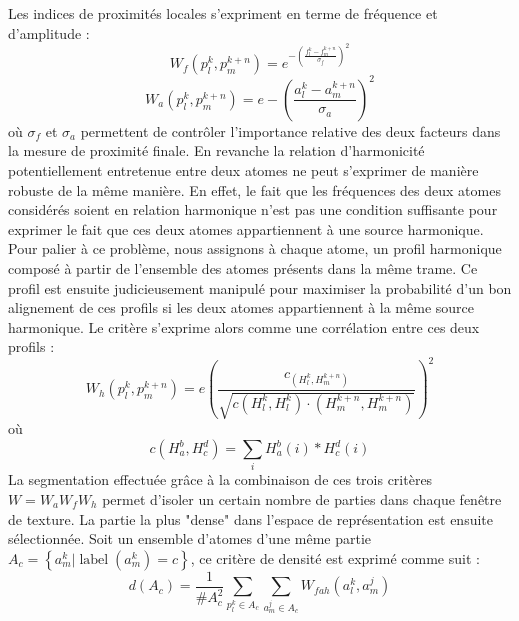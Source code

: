   Les indices de proximités locales s'expriment en terme de fréquence et d'amplitude :
  \begin{equation}
  W_f \left( p _ { l } ^ { k } , p _ { m } ^ { k + n } \right) = e ^ { - \left( \frac { f _ { l } ^ { k } - f _ { m } ^ { k + n } } { \sigma _ { f } } \right) ^ { 2 } }
  \end{equation}
  \begin{equation}
  W_a \left( p _ { l } ^ { k } , p _ { m } ^ { k + n } \right) =  { e } - \left( \frac { a _ { l } ^ { k } - a _ { m } ^ { k + n } } { \sigma _ { a } } \right) ^ { 2 }
  \end{equation}
  où $\sigma _ { f }$ et $\sigma _ { a }$ permettent de contrôler l'importance relative des deux facteurs dans la mesure de proximité finale. En revanche la relation d'harmonicité potentiellement entretenue entre deux atomes ne peut s'exprimer de manière robuste de la même manière. En effet, le fait que les fréquences des deux atomes considérés soient en relation harmonique n'est pas une condition suffisante pour exprimer le fait que ces deux atomes appartiennent à une source harmonique. Pour palier à ce problème, nous assignons à chaque atome, un profil harmonique composé à partir de l'ensemble des atomes présents dans la même trame. Ce profil est ensuite judicieusement manipulé pour maximiser la probabilité d'un bon alignement de ces profils si les deux atomes appartiennent à la même source harmonique\cite{lagrangeTaslp08}. Le critère s'exprime alors comme une corrélation entre ces deux profils :
  \begin{equation}
   { W _ { h } \left( p _ { l } ^ { k } , p _ { m } ^ { k + n } \right) = e \left( \frac { c _ { \left( H _ { l } ^ { k } , H _ { m } ^ { k + n } \right) } } { \sqrt { c \left( H _ { l } ^ { k } , H _ { l } ^ { k } \right) \cdot \left( H _ { m } ^ { k + n } , H _ { m } ^ { k + n } \right) } } \right) ^ { 2 } }
  \end{equation}
  où
  \begin{equation}
    { c \left( H _ { a } ^ { b } , H _ { c } ^ { d } \right) = \sum _ { i } H _ { a } ^ { b } ( i ) * H _ { c } ^ { d } ( i ) }
  \end{equation}
  La segmentation effectuée grâce à la combinaison de ces trois critères $W = W_a W_f W_h$ permet d'isoler un certain nombre de parties dans chaque fenêtre de texture. La partie la plus "dense" dans l'espace de représentation est ensuite sélectionnée. Soit un ensemble d'atomes d'une même partie $A _ { c } = \left\{ a _ { m } ^ { k } | \operatorname { label } \left( a _ { m } ^ { k } \right) = c \right\}$, ce critère de densité est exprimé comme suit :
  \begin{equation}
  d \left( A _ { c } \right) = \frac { 1 } { \# A _ { c } ^ { 2 } } \sum _ { p _ { l } ^ { k } \in A _ { c } } \sum _ { a _ { m } ^ { j } \in A _ { c } } W _ { f a h } \left( a _ { l } ^ { k } , a _ { m } ^ { j } \right)
  \end{equation}

